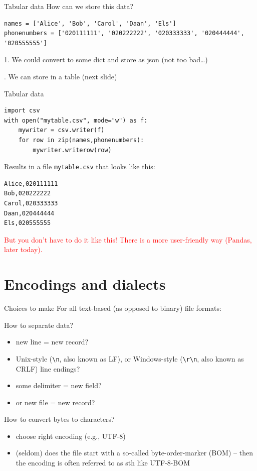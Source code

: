 \documentclass[compress]{beamer}
\begin{document}
\begin{frame}[fragile]{Tabular data}
How can we store this data?
\begin{lstlisting}
names = ['Alice', 'Bob', 'Carol', 'Daan', 'Els']
phonenumbers = ['020111111', '020222222', '020333333', '020444444', '020555555']
\end{lstlisting}
\pause

1. We could convert to some dict and store as json (not too bad\ldots)

. We can store in a table
(next slide)
\end{frame}

\begin{frame}[fragile]{Tabular data}
\begin{lstlisting}
import csv
with open("mytable.csv", mode="w") as f:
    mywriter = csv.writer(f)
    for row in zip(names,phonenumbers):
        mywriter.writerow(row)
\end{lstlisting}
	
Results in a file \texttt{mytable.csv} that looks like this:
\begin{lstlisting}
Alice,020111111
Bob,020222222
Carol,020333333
Daan,020444444
Els,020555555
\end{lstlisting}
\pause
\textcolor{red}{But you don't have to do it like this! There is a more user-friendly way (Pandas, later today).}
\end{frame}


\section{Encodings and dialects}


\begin{frame}{Choices to make}
For all text-based (as opposed to binary) file formats:
\begin{block}{How to separate data?}
	\begin{itemize}
		\item new line = new record?
		\item Unix-style (\texttt{\textbackslash n}, also known as LF),  or Windows-style (\texttt{\textbackslash r\textbackslash n}, also known as CRLF) line endings?
		\item some delimiter = new field?
		\item or new file = new record?
	\end{itemize}
\end{block}
\pause
\begin{block}{How to convert bytes to characters?}
	\begin{itemize}
		\item choose right encoding (e.g., UTF-8)
		\item (seldom) does the file start with a so-called byte-order-marker (BOM) -- then the encoding is often referred to as sth like UTF-8-BOM
	\end{itemize}
\end{block}
\end{frame}
\end{document}

